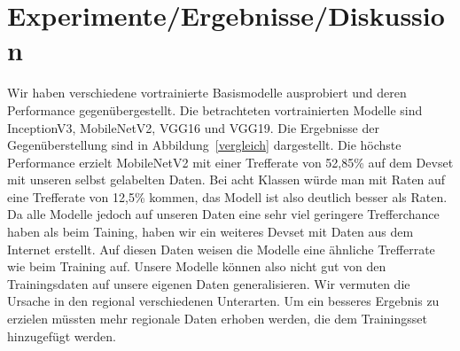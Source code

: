 \documentclass{article}
\begin{document}
\FloatBarrier

\section{Experimente/Ergebnisse/Diskussion}

Wir haben verschiedene vortrainierte Basismodelle ausprobiert und deren Performance gegenübergestellt. Die betrachteten vortrainierten Modelle sind InceptionV3, MobileNetV2, VGG16 und VGG19. Die Ergebnisse der Gegenüberstellung sind in Abbildung~\ref{vergleich} dargestellt. Die höchste Performance erzielt MobileNetV2 mit einer Trefferate von 52,85\% auf dem Devset mit unseren selbst gelabelten Daten. Bei acht Klassen würde man mit Raten auf eine Trefferate von 12,5\% kommen, das Modell ist also deutlich besser als Raten. Da alle Modelle jedoch auf unseren Daten eine sehr viel geringere Trefferchance haben als beim Taining, haben wir ein weiteres Devset mit Daten aus dem Internet erstellt. Auf diesen Daten weisen die Modelle eine ähnliche Trefferrate wie beim Training auf. Unsere Modelle können also nicht gut von den Trainingsdaten auf unsere eigenen Daten generalisieren. Wir vermuten die Ursache in den regional verschiedenen Unterarten. Um ein besseres Ergebnis zu erzielen müssten mehr regionale Daten erhoben werden, die dem Trainingsset hinzugefügt werden.
\end{document}
